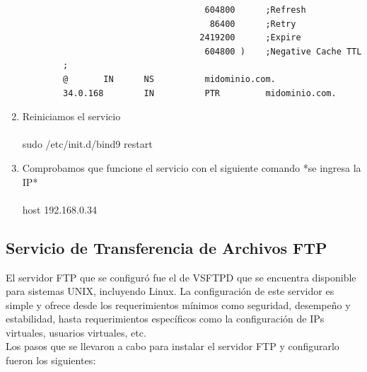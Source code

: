 \begin{enumerate}
\begin{verbatim}
                                    604800      ;Refresh
                                     86400      ;Retry
                                   2419200      ;Expire
                                    604800 )    ;Negative Cache TTL
        ;
        @       IN      NS          midominio.com.
        34.0.168        IN          PTR         midominio.com.
    \end{verbatim}
    \item Reiniciamos el servicio \\
    \\sudo /etc/init.d/bind9 restart\\
    \item Comprobamos que funcione el servicio con el siguiente comando *se ingresa la IP*\\
    \\host 192.168.0.34\\
    
    
\end{enumerate}



\subsection{Servicio de Transferencia de Archivos FTP}
\noindent
El servidor FTP que se configuró fue el de VSFTPD que se encuentra disponible para sistemas UNIX, incluyendo Linux. La configuración de este servidor es simple y ofrece desde los requerimientos mínimos como seguridad, desempeño y estabilidad, hasta requerimientos específicos como la configuración de IPs virtuales, usuarios virtuales, etc.\\    

\noindent
Los pasos que se llevaron a cabo para instalar el servidor FTP y configurarlo fueron los siguientes:

